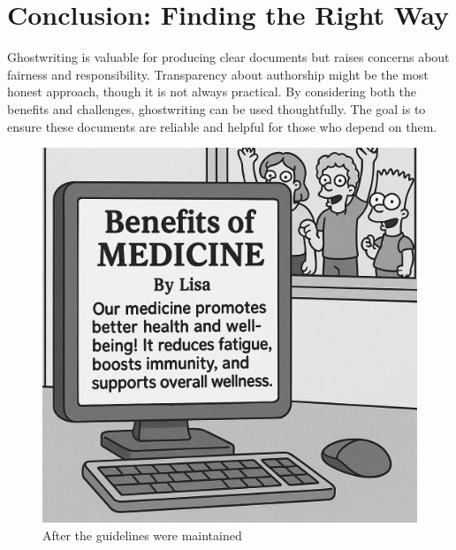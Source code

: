\documentclass[a4paper,10pt,twocolumn]{memoir}
\begin{document}
\section*{Conclusion: Finding the Right Way}
Ghostwriting is valuable for producing clear documents but raises concerns about fairness and responsibility. Transparency about authorship might be the most honest approach, though it is not always practical. By considering both the benefits and challenges, ghostwriting can be used thoughtfully. The goal is to ensure these documents are reliable and helpful for those who depend on them.
\begin{figure}[ht]
  \centering

  
  \includegraphics[width=\columnwidth]{gw3.png}
  \caption*{After the guidelines were maintained}
  \label{gw2}
\end{figure}
\end{document}
